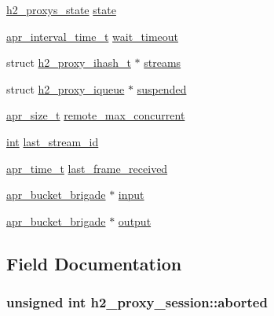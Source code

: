 \begin{DoxyCompactItemize}
\item 
\hyperlink{h2__proxy__session_8h_a59363bb01a8dd39f0ce73c35d6e6ee2a}{h2\+\_\+proxys\+\_\+state} \hyperlink{structh2__proxy__session_aeb8d7358e8c8bbe5b92a6f9c6e6ab3c7}{state}
\item 
\hyperlink{group__apr__time_gaae2129185a395cc393f76fabf4f43e47}{apr\+\_\+interval\+\_\+time\+\_\+t} \hyperlink{structh2__proxy__session_a6845156d89a261445999670ec49288fc}{wait\+\_\+timeout}
\item 
struct \hyperlink{structh2__proxy__ihash__t}{h2\+\_\+proxy\+\_\+ihash\+\_\+t} $\ast$ \hyperlink{structh2__proxy__session_aba423e4b2d9494c8452f485e91ae8c3d}{streams}
\item 
struct \hyperlink{structh2__proxy__iqueue}{h2\+\_\+proxy\+\_\+iqueue} $\ast$ \hyperlink{structh2__proxy__session_aec53df8c646b56d86866514f197b3b6f}{suspended}
\item 
\hyperlink{group__apr__platform_gaaa72b2253f6f3032cefea5712a27540e}{apr\+\_\+size\+\_\+t} \hyperlink{structh2__proxy__session_ab49dbd20568e86ad48028ca88f8db72f}{remote\+\_\+max\+\_\+concurrent}
\item 
\hyperlink{pcre_8txt_a42dfa4ff673c82d8efe7144098fbc198}{int} \hyperlink{structh2__proxy__session_ae9933747aede2be7d75ed08f7c3efa84}{last\+\_\+stream\+\_\+id}
\item 
\hyperlink{group__apr__time_gadb4bde16055748190eae190c55aa02bb}{apr\+\_\+time\+\_\+t} \hyperlink{structh2__proxy__session_ab067d7ae6b8d2221f6ea6ed2f582daad}{last\+\_\+frame\+\_\+received}
\item 
\hyperlink{structapr__bucket__brigade}{apr\+\_\+bucket\+\_\+brigade} $\ast$ \hyperlink{structh2__proxy__session_a7bf5242c9ebc2c7d2ffc50bde4eb0994}{input}
\item 
\hyperlink{structapr__bucket__brigade}{apr\+\_\+bucket\+\_\+brigade} $\ast$ \hyperlink{structh2__proxy__session_a6be91565be6fbd77848656f49a5f0c53}{output}
\end{DoxyCompactItemize}


\subsection{Field Documentation}
\subsubsection[{\texorpdfstring{aborted}{aborted}}]{\setlength{\rightskip}{0pt plus 5cm}unsigned {\bf int} h2\+\_\+proxy\+\_\+session\+::aborted}\hypertarget{structh2__proxy__session_af89e350dd79ea92356f89664607b61b9}{}\label{structh2__proxy__session_af89e350dd79ea92356f89664607b61b9}
